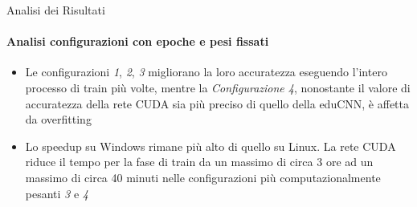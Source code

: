 \documentclass[
 ]{beamer}
\begin{document}
\begin{frame}{Analisi dei Risultati}
    \framesubtitle{Analisi configurazioni con epoche e pesi fissati}
    \smallskip
    \begin{itemize} [<+->]
        \setlength\itemsep{2em}
        \item \large Le configurazioni \emph{1}, \emph{2}, \emph{3} migliorano la loro accuratezza eseguendo l'intero processo di train più volte, mentre la \emph{Configurazione 4}, nonostante il valore di accuratezza della rete CUDA sia più preciso di quello della eduCNN, è affetta da overfitting
        \item \large Lo speedup su Windows rimane più alto di quello su Linux. La rete CUDA riduce il tempo per la fase di train da un massimo di circa 3 ore ad un massimo di circa 40 minuti nelle configurazioni più computazionalmente pesanti \emph{3} e \emph{4}
    \end{itemize}     
\end{frame}




\end{document}

